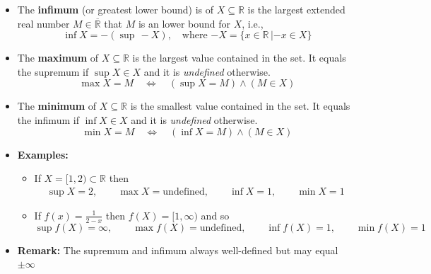 \documentclass[11pt,twoside]{report}
\newcommand{\bbR}{{\mathbb{R}}}
\begin{document}
\begin{itemize}
\begin{itemize}
 
 \item The \textbf{infimum} (or greatest lower bound)  is of $X\subseteq \bbR$ is the  largest extended real number $M \in \overline{\bbR}$ that $M$ is an lower bound for $X$, i.e., 
\[
\inf X = - \left(\sup \, -\!X\right), \quad \text{where $-\!X = \{x\in \mathbb{R}\,|-\!x\in X\}$}
\]
 


\item %
 The \textbf{maximum} of $X\subseteq \bbR$ is the largest value contained in the set.
It equals the supremum if $\sup X \in X$ and it is \emph{undefined} otherwise.
\[
\max X = M \quad \iff \quad  (\sup X =  M) \wedge (M \in X)
\]


\item %
 The \textbf{minimum} of $X\subseteq \bbR$ is the smallest value contained in the set.
It equals the infimum if $\inf X \in X$ and it is \emph{undefined} otherwise.
\[
\min X = M \quad \iff \quad  (\inf X =  M) \wedge (M \in X)
\]



\item \textbf{Examples:} 
\begin{itemize}
\item If $X = [1,2) \subset \mathbb{R}$ then
\begin{align*}
\sup X = 2, \qquad \max X = \text{undefined}, \qquad \inf X = 1, \qquad \min X = 1
\end{align*}
%
\item If $f(x)=\frac{1}{2-x}$ then $f(X) = [1, \infty)$ and so 
\[
\sup f(X) = \infty, \qquad \max f(X) = \text{undefined}, \qquad \inf f(X) = 1, \qquad \min f(X) = 1
\]
\end{itemize}

\item \textbf{Remark:} The supremum and infimum always well-defined but may equal $\pm \infty$



\end{itemize}
\end{itemize}
\end{document}
